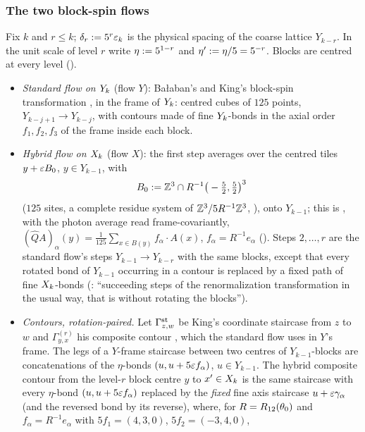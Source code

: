 \subsubsection*{The two block-spin flows}

\begin{definition}\label{rot:def:flows}
Fix $k$ and $r\le k$; $\delta_r:=5^r\varepsilon_k$ is the physical spacing of the coarse lattice $Y_{k-r}$. In the unit scale of level $r$ write $\eta:=5^{1-r}$ and $\eta':=\eta/5=5^{-r}$. Blocks are centred at every level ().
\begin{itemize}[leftmargin=*]
\item \emph{Standard flow on $Y_k$} (flow $Y$): Ba{\l}aban's and King's block-spin transformation \cite[(2.1)--(2.11)]{Ba1}, \cite[(2.10)--(2.17)]{K1} in the frame of $Y_k$: centred cubes of $125$ points, $Y_{k-j+1}\to Y_{k-j}$, with contours made of fine $Y_k$-bonds in the axial order $f_1,f_2,f_3$ of the frame inside each block.
\item \emph{Hybrid flow on $X_k$} (flow $X$): the first step averages over the centred tiles $y+\varepsilon B_0$, $y\in Y_{k-1}$, with
\[
B_0:=\mathbb Z^3\cap R^{-1}\big(-\tfrac52,\tfrac52\big)^3
\]
($125$ sites, a complete residue system of $\mathbb Z^3/5R^{-1}\mathbb Z^3$, ), onto $Y_{k-1}$; this is \cite[(4.3)--(4.4)]{K2}, with the photon average read frame-covariantly, $(\hat QA)_\alpha(y)=\frac1{125}\sum_{x\in B(y)}f_\alpha\cdot A(x)$, $f_\alpha=R^{-1}e_\alpha$ (). Steps $2,\dots,r$ are the standard flow's steps $Y_{k-1}\to Y_{k-r}$ with the same blocks, except that every rotated bond of $Y_{k-1}$ occurring in a contour is replaced by a fixed path of fine $X_k$-bonds (\cite[p.~336]{K2}: ``succeeding steps of the renormalization transformation in the usual way, that is without rotating the blocks'').
\item \emph{Contours, rotation-paired.} Let $\Gamma^{\rm st}_{z,w}$ be King's coordinate staircase from $z$ to $w$ \cite[(2.12)]{K1} and $\Gamma^{(r)}_{y,x}$ his composite contour \cite[(2.11)]{K1}, which the standard flow uses in $Y$'s frame. The legs of a $Y$-frame staircase between two centres of $Y_{k-1}$-blocks are concatenations of the $\eta$-bonds $(u,u+5\varepsilon f_\alpha)$, $u\in Y_{k-1}$. The hybrid composite contour from the level-$r$ block centre $y$ to $x'\in X_k$ is the same staircase with every $\eta$-bond $(u,u+5\varepsilon f_\alpha)$ replaced by the \emph{fixed} fine axis staircase $u+\varepsilon\gamma_\alpha$ (and the reversed bond by its reverse), where, for $R=R_{12}(\theta_0)$ and $f_\alpha=R^{-1}e_\alpha$ with $5f_1=(4,3,0)$, $5f_2=(-3,4,0)$,

\end{itemize}
\end{definition}
